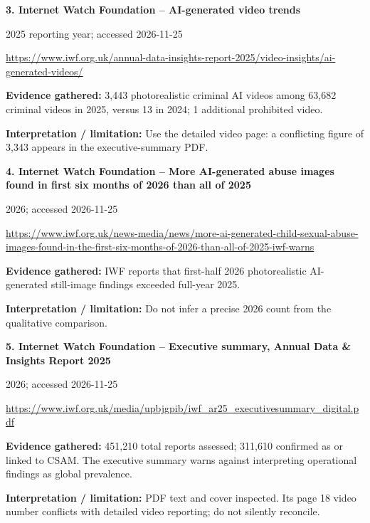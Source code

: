 \documentclass[11pt,a4paper]{article}
\begin{document}
\noindent\begin{minipage}{\linewidth}\textbf{3. Internet Watch Foundation -- AI-generated video trends}\par{\small 2025 reporting year; accessed 2026-11-25\par\url{https://www.iwf.org.uk/annual-data-insights-report-2025/video-insights/ai-generated-videos/}}\par
\textbf{Evidence gathered:} 3,443 photorealistic criminal AI videos among 63,682 criminal videos in 2025, versus 13 in 2024; 1 additional prohibited video.\par\textbf{Interpretation / limitation:} Use the detailed video page: a conflicting figure of 3,343 appears in the executive-summary PDF.\par
\end{minipage}\par\vspace{2mm}
\noindent\begin{minipage}{\linewidth}\textbf{4. Internet Watch Foundation -- More AI-generated abuse images found in first six months of 2026 than all of 2025}\par{\small 2026; accessed 2026-11-25\par\url{https://www.iwf.org.uk/news-media/news/more-ai-generated-child-sexual-abuse-images-found-in-the-first-six-months-of-2026-than-all-of-2025-iwf-warns}}\par
\textbf{Evidence gathered:} IWF reports that first-half 2026 photorealistic AI-generated still-image findings exceeded full-year 2025.\par\textbf{Interpretation / limitation:} Do not infer a precise 2026 count from the qualitative comparison.\par
\end{minipage}\par\vspace{2mm}
\noindent\begin{minipage}{\linewidth}\textbf{5. Internet Watch Foundation -- Executive summary, Annual Data \& Insights Report 2025}\par{\small 2026; accessed 2026-11-25\par\url{https://www.iwf.org.uk/media/upbjgpib/iwf_ar25_executivesummary_digital.pdf}}\par
\textbf{Evidence gathered:} 451,210 total reports assessed; 311,610 confirmed as or linked to CSAM. The executive summary warns against interpreting operational findings as global prevalence.\par\textbf{Interpretation / limitation:} PDF text and cover inspected. Its page 18 video number conflicts with detailed video reporting; do not silently reconcile.\par
\end{minipage}\par\vspace{2mm}
\end{document}
